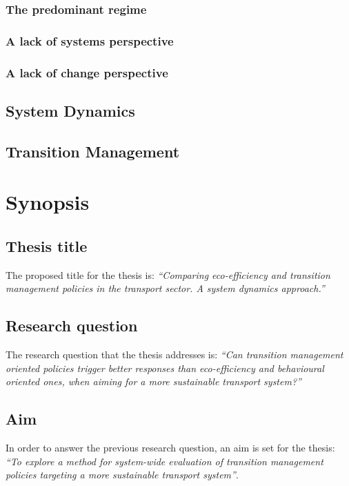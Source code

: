 \documentclass[a4paper,fontsize=10pt,bibliography=totoc]{scrartcl}
\begin{document}
\begin{multicols}{2}
\subsubsection*{The predominant regime}
\subsubsection*{A lack of systems perspective}
\subsubsection*{A lack of change perspective}
\subsection{System Dynamics}
\subsection{Transition Management}

\section{Synopsis}
\label{s:synopsis}
\subsection*{Thesis title}
The proposed title for the thesis is: \textit{``Comparing eco-efficiency and transition management policies in the transport sector. A system dynamics approach.''}

\subsection*{Research question}
The research question that the thesis addresses is: \textit{``Can transition management oriented policies trigger better responses than eco-efficiency and behavioural oriented ones, when aiming for a more sustainable transport system?''}

\subsection*{Aim}
In order to answer the previous research question, an aim is set for the thesis: \textit{``To explore a method for system-wide evaluation of transition management policies targeting a more sustainable transport system''}.


\end{multicols}
\end{document}
